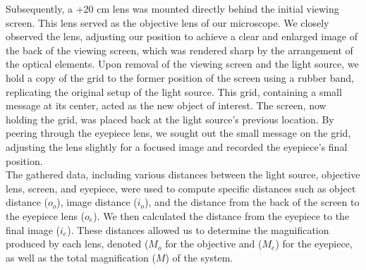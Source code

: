 \documentclass[a4paper,11pt]{article}
\begin{document}
Subsequently, a +20 cm lens was mounted directly behind the initial viewing screen. This lens served as the objective lens of our microscope. We closely observed the lens, adjusting our position to achieve a clear and enlarged image of the back of the viewing screen, which was rendered sharp by the arrangement of the optical elements. Upon removal of the viewing screen and the light source, we hold a copy of the grid to the former position of the screen using a rubber band, replicating the original setup of the light source. This grid, containing a small message at its center, acted as the new object of interest. The screen, now holding the grid, was placed back at the light source's previous location. By peering through the eyepiece lens, we sought out the small message on the grid, adjusting the lens slightly for a focused image and recorded the eyepiece's final position.\\

The gathered data, including various distances between the light source, objective lens, screen, and eyepiece, were used to compute specific distances such as object distance (\( o_o \)), image distance (\( i_o \)), and the distance from the back of the screen to the eyepiece lens (\( o_e \)). We then calculated the distance from the eyepiece to the final image (\( i_e \)). These distances allowed us to determine the magnification produced by each lens, denoted (\( M_o \) for the objective and (\( M_e \)) for the eyepiece, as well as the total magnification (\( M \)) of the system.\\
\newpage
{}
\end{document}
